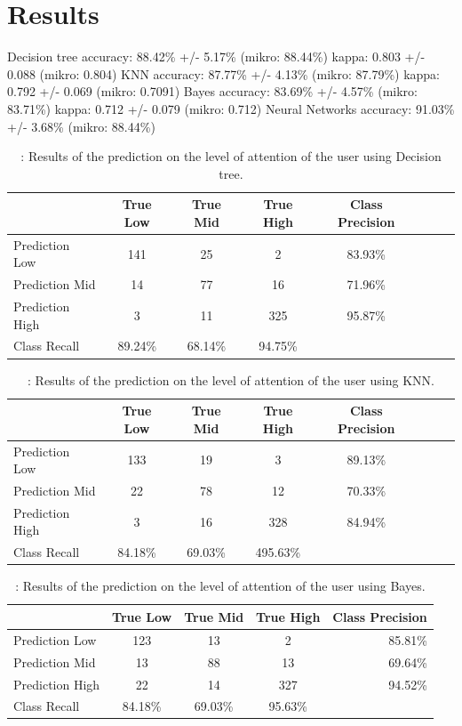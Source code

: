 \documentclass[journal]{IEEEtran}
\begin{document}
\section {Results}
Decision tree accuracy: 88.42\% +/- 5.17\% (mikro: 88.44\%) kappa: 0.803 +/- 0.088 (mikro: 0.804)
KNN accuracy: 87.77\% +/- 4.13\% (mikro: 87.79\%) kappa: 0.792 +/- 0.069 (mikro: 0.7091)
Bayes accuracy: 83.69\% +/- 4.57\% (mikro: 83.71\%) kappa: 0.712 +/- 0.079 (mikro: 0.712)
Neural Networks accuracy: 91.03\% +/- 3.68\% (mikro: 88.44\%) 
\begin{table}[H]
\caption{: Results of the prediction on the level of attention of the user using Decision tree. }
\begin{tabular}{l*{6}{c}r}
									& True Low & True Mid & True High & Class Precision \\
\hline
Prediction Low  & 141 & 25 & 2 & 83.93\% \\
Prediction Mid  & 14 & 77 & 16 & 71.96\%  \\
Prediction High & 3 & 11 & 325 & 95.87\%  \\
\hline
Class Recall    & 89.24\% & 68.14\% & 94.75\% &  \\
\end{tabular}	

 
\end{table}

\begin{table}[H]
\caption{: Results of the prediction on the level of attention of the user using KNN. }
\begin{tabular}{l*{6}{c}r}
									& True Low & True Mid & True High & Class Precision \\
\hline
Prediction Low  & 133 & 19 & 3 & 89.13\% \\
Prediction Mid  & 22 & 78 & 12 & 70.33\%  \\
Prediction High & 3 & 16 & 328 & 84.94\%  \\
\hline
Class Recall    & 84.18\% & 69.03\% & 495.63\% &  \\
\end{tabular}	
\end{table}

\begin{table}[H]
\caption{: Results of the prediction on the level of attention of the user using Bayes. }
\begin{tabular}{l*{3}{c}r}
									& True Low & True Mid & True High & Class Precision \\
\hline
Prediction Low  & 123 & 13 & 2 & 85.81\% \\
Prediction Mid  & 13 & 88 & 13 & 69.64\%  \\
Prediction High & 22 & 14 & 327 & 94.52\%  \\
\hline
Class Recall    & 84.18\% & 69.03\% & 95.63\% &  \\
\end{tabular}	
\end{table}
\end{document}
